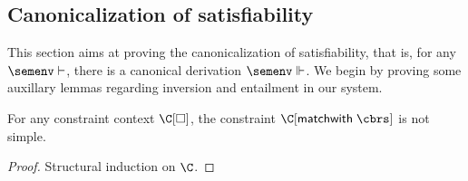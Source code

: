 \documentclass[acmsmall,screen,nonacm,review]{acmart}
\begin{document}
\subsection{Canonicalization of satisfiability}

This section aims at proving the canonicalization of satisfiability, that is,
for any $\semenv \th \c$, there is a canonical derivation $\semenv \Th \c$.
%
We begin by proving some auxillary lemmas regarding inversion and
entailment in our system.

\begin{lemma}
  \label{lem:match-is-not-simple}
  For any constraint context $\C\where{\square}$,
  the constraint $\C\where{\cmatch \t \cbrs}$ is not simple.
  \begin{proof}
    Structural induction on $\C$.
  \end{proof}
\end{lemma}

\newcommand{\simplePf}[2]{\Pf{#1}{}{\simple}{#2}}
\newcommand{\nsimplePf}[2]{\Pf{}{\neg}{#1 \simple}{#2}}
\newcommand{\shapePf}[4]{\Pf{}{}{\Cshape {#1} {#2} {#3}}{#4}}
\end{document}

